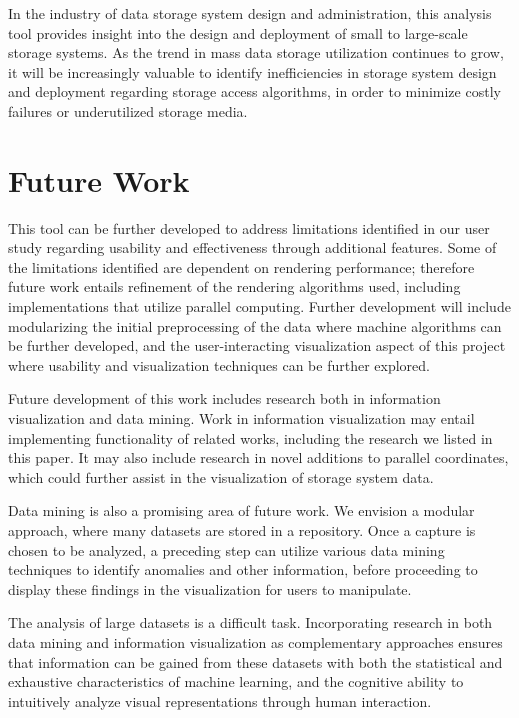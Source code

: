 \documentclass[journal]{vgtc}                %
\begin{document}
In the industry of data storage system design and administration, this analysis tool provides insight into the design and deployment of small to large-scale storage systems. As the trend in mass data storage utilization continues to grow, it will be increasingly valuable to identify inefficiencies in storage system design and deployment regarding storage access algorithms, in order to minimize costly failures or underutilized storage media.

\section{Future Work}
\label{future_work}
This tool can be further developed to address limitations identified in our user study regarding usability and effectiveness through additional features. Some of the limitations identified are dependent on rendering performance; therefore future work entails refinement of the rendering algorithms used, including implementations that utilize parallel computing. Further development will include modularizing the initial preprocessing of the data where machine algorithms can be further developed, and the user-interacting visualization aspect of this project where usability and visualization techniques can be further explored.

Future development of this work includes research both in information visualization and data mining. Work in information visualization may entail implementing functionality of related works, including the research we listed in this paper. It may also include research in novel additions to parallel coordinates, which could further assist in the visualization of storage system data.

Data mining is also a promising area of future work. We envision a modular approach, where many datasets are stored in a repository. Once a capture is chosen to be analyzed, a preceding step can utilize various data mining techniques to identify anomalies and other information, before proceeding to display these findings in the visualization for users to manipulate.

The analysis of large datasets is a difficult task. Incorporating research in both data mining and information visualization as complementary approaches ensures that information can be gained from these datasets with both the statistical and exhaustive characteristics of machine learning, and the cognitive ability to intuitively analyze visual representations through human interaction.





\end{document}
